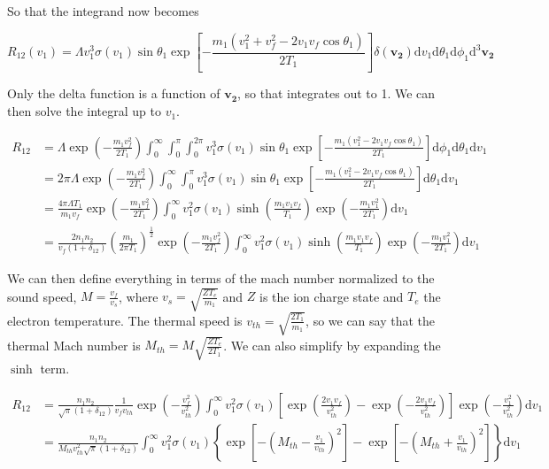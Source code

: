 \documentclass[11pt]{article}
\begin{document}
So that the integrand now becomes

\begin{equation}
	R_{12} (v_1) = \Lambda v_1^3 \sigma(v_1) \sin \theta_1 \exp \left[ -\frac{m_1 (v_1^2 + v_f^2 - 2 v_1 v_f \cos \theta_1)}{2 T_1} \right] \delta( \mathbf{v_2} ) \mathrm{d} v_1 \mathrm{d} \theta_1 \mathrm{d} \phi_1  \mathrm{d}^3 \mathbf{v_2}
\end{equation}

Only the delta function is a function of $\mathbf{v_2}$, so that integrates out to 1. We can then solve the integral up to $v_1$.

\begin{align}
	R_{12} &= \Lambda \exp \left( -\frac{m_1 v_f^2}{2 T_1} \right)  \int_0^\infty \int_0^{\pi} \int_0^{2 \pi} v_1^3 \sigma(v_1) \sin \theta_1 \exp \left[ -\frac{m_1 (v_1^2 - 2 v_1 v_f \cos \theta_1)}{2 T_1} \right] \mathrm{d} \phi_1 \mathrm{d} \theta_1 \mathrm{d} v_1 \\
	&= 2 \pi \Lambda \exp \left( -\frac{m_1 v_f^2}{2 T_1} \right)  \int_0^\infty \int_0^{\pi} v_1^3 \sigma(v_1) \sin \theta_1 \exp \left[ - \frac{m_1 (v_1^2 - 2 v_1 v_f \cos \theta_1)}{2 T_1} \right] \mathrm{d} \theta_1 \mathrm{d} v_1 \\
	&= \frac{4 \pi \Lambda T_1}{m_1 v_f} \exp \left( -\frac{m_1 v_f^2}{2 T_1} \right)  \int_0^\infty v_1^2 \sigma(v_1) \sinh \left( \frac{m_1 v_1 v_f}{T_1} \right) \exp \left( -\frac{m_1 v_1^2}{2 T_1} \right) \mathrm{d} v_1 \\
	&= \frac{2 n_1 n_2}{v_f (1 + \delta_{12})} \left( \frac{m_1}{2 \pi T_1} \right)^{\frac{1}{2}} \exp \left( -\frac{m_1 v_f^2}{2 T_1} \right)  \int_0^\infty v_1^2 \sigma(v_1) \sinh \left( \frac{m_1 v_1 v_f}{T_1} \right) \exp \left( -\frac{m_1 v_1^2}{2 T_1} \right) \mathrm{d} v_1
\end{align}

We can then define everything in terms of the mach number normalized to the sound speed, $M = \frac{v_f}{v_s}$, where $v_s = \sqrt{\frac{Z T_e}{m_1}}$ and $Z$ is the ion charge state and $T_e$ the electron temperature. The thermal speed is $v_{th} = \sqrt{\frac{2 T_1}{m_1}}$, so we can say that the thermal Mach number is $M_{th} = M \sqrt{\frac{Z T_e}{2 T_1}}$. We can also simplify by expanding the $\sinh$ term.

\begin{align}
	R_{12} &= \frac{n_1 n_2}{\sqrt{\pi} (1 + \delta_{12})} \frac{1}{v_f v_{th}} \exp \left( -\frac{v_f^2}{v_{th}^2} \right)  \int_0^\infty v_1^2 \sigma(v_1) \left[ \exp \left( \frac{2 v_1 v_f}{v_{th}^2} \right) - \exp \left( -\frac{2 v_1 v_f}{v_{th}^2} \right) \right] \exp \left( -\frac{v_1^2}{v_{th}^2} \right) \mathrm{d} v_1\\
	&= \frac{n_1 n_2}{M_{th} v_{th}^2 \sqrt{\pi} (1 + \delta_{12})} \int_0^\infty v_1^2 \sigma(v_1) \left\lbrace \exp \left[ -\left( M_{th} - \frac{v_1}{v_{th}} \right)^2 \right] - \exp \left[ -\left( M_{th} + \frac{v_1}{v_{th}} \right)^2 \right] \right\rbrace \mathrm{d} v_1
\end{align}
\end{document}

